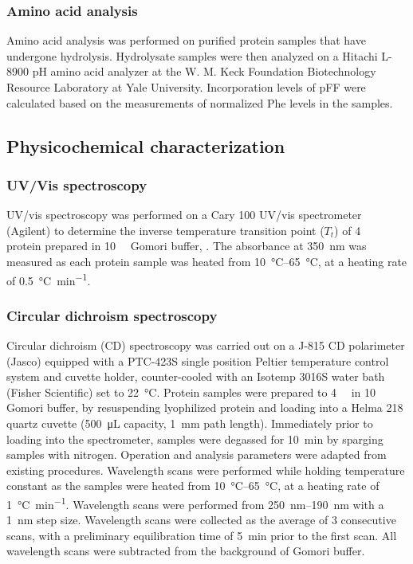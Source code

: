 \begin{refsection}
\subsubsection{Amino acid analysis}

Amino acid analysis was performed on purified protein samples that have
undergone hydrolysis. Hydrolysate samples were then analyzed on a Hitachi L-8900
pH amino acid analyzer at the W. M. Keck Foundation Biotechnology Resource
Laboratory at Yale University. Incorporation levels of pFF were calculated based
on the measurements of normalized Phe levels in the samples.

\subsection{Physicochemical characterization}

\subsubsection{UV/Vis spectroscopy}

UV/vis spectroscopy was performed on a Cary 100 UV/vis spectrometer (Agilent) to
determine the inverse temperature transition point ({$T_t$}) of 
\SI{4}{\micro\moLar} protein prepared in \SI{10}{\milli\moLar} Gomori buffer,
. The absorbance at \SI{350}{\nm} was measured as each protein sample was
heated from \SIrange{10}{65}{\celsius}, at a heating rate of
\SI{0.5}{\celsius\per\minute}.\cite{Chilkoti2002a}

\subsubsection{Circular dichroism spectroscopy}

Circular dichroism (CD) spectroscopy was carried out on a J-815 CD polarimeter
(Jasco) equipped with a PTC-423S single position Peltier temperature control
system and cuvette holder, counter-cooled with an Isotemp 3016S water bath
(Fisher Scientific) set to \SI{22}{\celsius}. Protein samples were prepared to
\SI{4}{\micro\moLar} in \SI{10}{\milli\moLar} Gomori buffer, by resuspending
lyophilized protein and loading into a Helma 218 quartz cuvette (\SI{500}{\uL}
capacity, \SI{1}{mm} path length). Immediately prior to loading into the
spectrometer, samples were degassed for \SI{10}{\minute} by sparging samples
with nitrogen. Operation and analysis parameters were adapted from existing
procedures.\cite{Haghpanah2009} Wavelength scans were performed while holding
temperature constant as the samples were heated from \SIrange{10}{65}{\celsius},
at a heating rate of \SI{1}{\celsius\per\minute}.  Wavelength scans were
performed from \SIrange{250}{190}{\nm} with a \SI{1}{\nm} step size. Wavelength
scans were collected as the average of 3 consecutive scans, with a preliminary
equilibration time of \SI{5}{\minute} prior to the first scan. All wavelength
scans were subtracted from the background of Gomori buffer.


\end{refsection}
